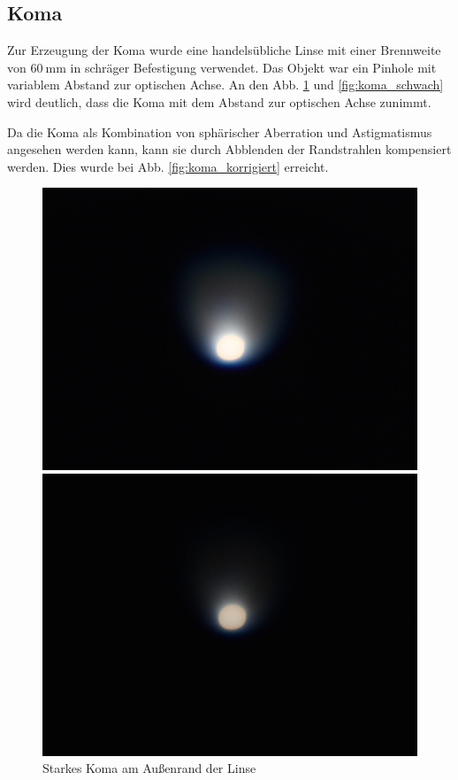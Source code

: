 \subsection{Koma}

Zur Erzeugung der Koma wurde eine handelsübliche Linse mit einer Brennweite von $\SI{60}{\milli\meter}$ in schräger Befestigung verwendet. Das Objekt war ein Pinhole mit variablem Abstand zur optischen Achse. An den Abb. \ref{fig:koma_stark} und \ref{fig:koma_schwach} wird deutlich, dass die Koma mit dem Abstand zur optischen Achse zunimmt. 

Da die Koma als Kombination von sphärischer Aberration und Astigmatismus angesehen werden kann, kann sie durch Abblenden der Randstrahlen kompensiert werden. Dies wurde bei Abb. \ref{fig:koma_korrigiert} erreicht.

\begin{figure}[htb]
	\begin{minipage}[t]{0.32\textwidth}
		\includegraphics[width=\linewidth]{img/Koma/Prakt_Linsenfehler_2015_06_04_097}
		\caption{Starkes Koma am Außenrand der Linse}
		\label{fig:koma_stark}
	\end{minipage}
	\hfill
	\begin{minipage}[t]{0.32\textwidth}
		\includegraphics[width=\linewidth]{img/Koma/Prakt_Linsenfehler_2015_06_04_096}

\end{minipage}
\end{figure}
